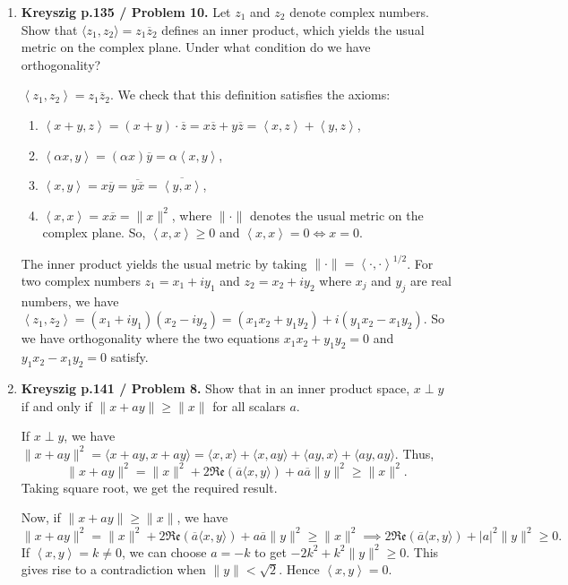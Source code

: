 \documentclass[12pt]{article}
\newcommand{\inn}[2]{\left\langle #1, #2 \right\rangle}
\begin{document}
\begin{enumerate}
\item \textbf{Kreyszig p.135 / Problem 10.}
Let $z_1$ and $z_2$ denote complex numbers.
Show that $\langle z_1,z_2\rangle = z_1\overline{z}_2$
defines an inner product, which yields
the usual metric on
the complex plane. Under what condition do we have
orthogonality?
\begin{mybox}

    $\inn{z_1}{z_2}=z_1\overline{z}_2$. We check that
    this definition satisfies the axioms:
    \begin{enumerate}
        \item $\inn{x+y}{z}=(x+y)\cdot\overline{z}
        =x\overline{z}+y\overline{z}=\inn{x}{z}+
        \inn{y}{z}$,

        \item $\inn{\alpha x}{y}=(\alpha x)\overline{y}
        =\alpha\inn{x}{y}$,

        \item $\inn{x}{y}=x\overline{y}=\overline
        {y\overline{x}}=\overline{\inn{y}{x}}$,

        \item $\inn{x}{x}=x\overline{x}=\|x\|^2$, where
        $\|\cdot\|$ denotes the usual metric on the complex
        plane. So, $\inn{x}{x}\geq 0$ and $\inn{x}{x}=0
        \iff x=0$.
    \end{enumerate}

    The inner product yields the usual metric by taking
    $\|\cdot\|=\inn{\cdot}{\cdot}^{1/2}$. For two complex
    numbers $z_1=x_1+iy_1$ and $z_2=x_2+iy_2$ where $x_j$
    and $y_j$ are real numbers, we have
    $\inn{z_1}{z_2}=(x_1+iy_1)(x_2-iy_2)=
    (x_1x_2+y_1y_2)+i(y_1x_2-x_1y_2)$. So we have
    orthogonality where the two equations
    $x_1x_2+y_1y_2=0$ and $y_1x_2-x_1y_2=0$ satisfy.
\end{mybox}
 
\item \textbf{Kreyszig p.141 / Problem 8.}
Show that in an inner product space, $x\perp y$ if and
only if $\|x+ay\|\geq\|x\|$ for all scalars $a$.
\begin{mybox}

    If $x\perp y$, we have $\|x+ay\|^2=\langle x+ay,
    x+ay\rangle=\langle x,x \rangle+\langle x,ay\rangle+
    \langle ay, x \rangle+ \langle ay, ay \rangle$. Thus,
    $$\|x+ay\|^2=\|x\|^2+2\mathfrak{Re}(\overline{a}
    \langle x, y
    \rangle)+a\overline{a}\|y\|^2\geq \|x\|^2.$$
    Taking square root, we get the required result.

    \vspace*{3mm}
    Now, if $\|x+ay\|\geq\|x\|$, we have
    $$\|x+ay\|^2=\|x\|^2+2\mathfrak{Re}(\overline{a}
    \langle x, y
    \rangle)+a\overline{a}\|y\|^2\geq \|x\|^2
    \implies 2\mathfrak{Re}(\overline{a}
    \langle x, y
    \rangle)+|a|^2\|y\|^2\geq 0.$$
    If $\inn{x}{y}=k\neq 0$, we can choose $a=-k$
    to get $-2k^2+k^2\|y\|^2\geq 0$. This gives rise to
    a contradiction when $\|y\|<\sqrt{2}$. Hence $\inn{x}
    {y}=0$.
\end{mybox}
 

\end{enumerate}
\end{document}

